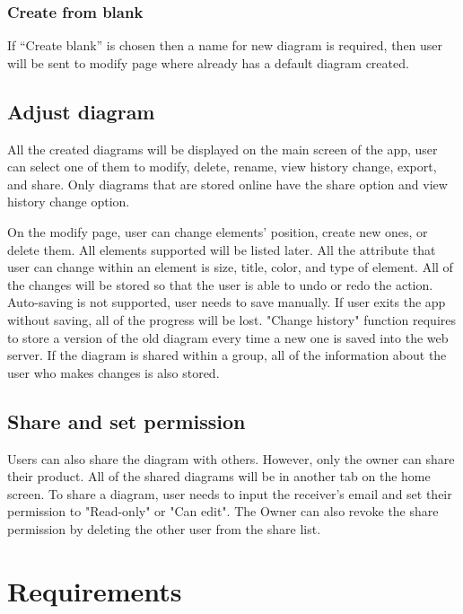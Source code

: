 \subsubsection{Create from blank}
If ``Create blank'' is chosen then a name for new diagram is required, then user will be sent to modify page where already has a default diagram created.

\subsection{Adjust diagram}
All the created diagrams will be displayed on the main screen of the app, user can select one of them to modify, delete, rename, view history change, export, and share. Only diagrams that are stored online have the share option and view history change option.

On the modify page, user can change elements' position, create new ones, or delete them. All elements supported will be listed later. All the attribute that user can change within an element is size, title, color, and type of element. All of the changes will be stored so that the user is able to undo or redo the action. Auto-saving is not supported, user needs to save manually. If user exits the app without saving, all of the progress will be lost.
"Change history" function requires to store a version of the old diagram every time a new one is saved into the web server. If the diagram is shared within a group, all of the information about the user who makes changes is also stored.

\subsection{Share and set permission}
Users can also share the diagram with others. However, only the owner can share their product. All of the shared diagrams will be in another tab on the home screen. To share a diagram, user needs to input the receiver's email and set their permission to "Read-only" or "Can edit". The Owner can also revoke the share permission by deleting the other user from the share list.

\section{Requirements}
